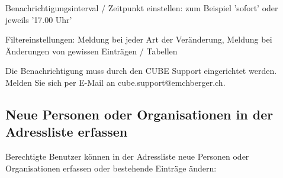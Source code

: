 \vspace{\baselineskip}

\begin{compactitem}
	\item Benachrichtigungsinterval / Zeitpunkt einstellen: zum Beispiel 'sofort' oder jeweils '17.00 Uhr'
	\item Filtereinstellungen: Meldung bei jeder Art der Veränderung, Meldung bei Änderungen von gewissen Einträgen / Tabellen
\end{compactitem}

\vspace{\baselineskip}

Die Benachrichtigung muss durch den CUBE Support eingerichtet werden. Melden Sie sich per E-Mail an {\color{red} cube.support@emchberger.ch}.

\clearpage
\subsection{Neue Personen oder Organisationen in der Adressliste erfassen}
\label{bkm:Ref2018071901}
Berechtigte Benutzer können in der Adressliste neue Personen oder Organisationen erfassen oder bestehende Einträge ändern:

\vspace{\baselineskip}

